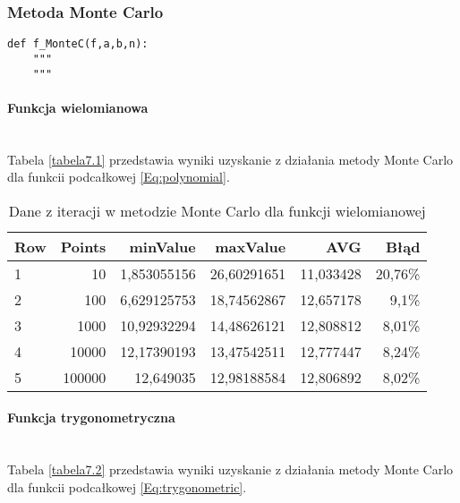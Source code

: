 \documentclass[12pt,twoside]{article}
\begin{document}
\subsubsection{Metoda Monte Carlo}

\begin{lstlisting}[caption={Kod w języku python implementujący metodę Monte Carlo}]
def f_MonteC(f,a,b,n):
    """
    """
\end{lstlisting}
\label{Listing 11}

\paragraph{Funkcja wielomianowa}\mbox{} \\

Tabela \eqref{tabela7.1} przedstawia wyniki uzyskanie z działania metody Monte Carlo dla funkcii podcałkowej \eqref{Eq:polynomial}.

\begin{table}[H]
\centering 
\caption{Dane z iteracji w metodzie Monte Carlo dla funkcji wielomianowej}
\label{tabela7.1}
\begin{tabular}{lrrrrr}
\toprule
{Row} &  Points &  minValue &  maxValue &       AVG &      Błąd \\
\midrule
1  &     10 & 1,853055156 &   26,60291651 & 11,033428 & 20,76\% \\
2  &     100 & 6,629125753 &  18,74562867 & 12,657178 & 9,1\% \\
3  &     1000 & 10,92932294 &   14,48626121 & 12,808812 & 8,01\% \\
4  &     10000 & 12,17390193 &  13,47542511 & 12,777447 & 8,24\% \\
5  &     100000 & 12,649035 &  12,98188584 & 12,806892& 8,02\% \\
\bottomrule
\end{tabular}
\end{table}

\paragraph{Funkcja trygonometryczna}\mbox{} \\

Tabela \eqref{tabela7.2} przedstawia wyniki uzyskanie z działania metody Monte Carlo dla funkcii podcałkowej \eqref{Eq:trygonometric}.
\end{document}
